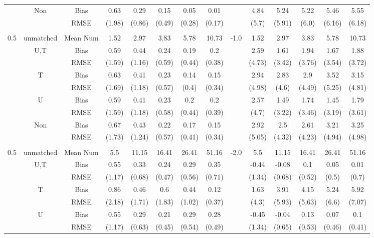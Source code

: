 \begin{tabular}{@{\extracolsep{5pt}}lc|cccccc|lccccc}
 & Non & Bias & 0.63 & 0.29 & 0.15 & 0.05 & 0.01 &  & 4.84 & 5.24 & 5.22 & 5.46 & 5.55 \\
 &  & RMSE & (1.98) & (0.86) & (0.49) & (0.28) & (0.17) &  & (5.7) & (5.91) & (6.0) & (6.16) & (6.18) \\
 &  &  &  &  &  &  &  &  &  &  &  &  &  \\
0.5 & unmatched & Mean Num & 1.52 & 2.97 & 3.83 & 5.78 & 10.73 & -1.0 & 1.52 & 2.97 & 3.83 & 5.78 & 10.73 \\
 & U,T & Bias & 0.59 & 0.44 & 0.24 & 0.19 & 0.2 &  & 2.59 & 1.61 & 1.94 & 1.67 & 1.88 \\
 &  & RMSE & (1.59) & (1.16) & (0.59) & (0.44) & (0.38) &  & (4.73) & (3.42) & (3.76) & (3.54) & (3.72) \\
 & T & Bias & 0.63 & 0.41 & 0.23 & 0.14 & 0.15 &  & 2.94 & 2.83 & 2.9 & 3.52 & 3.15 \\
 &  & RMSE & (1.69) & (1.18) & (0.57) & (0.4) & (0.34) &  & (4.98) & (4.6) & (4.49) & (5.25) & (4.81) \\
 & U & Bias & 0.59 & 0.41 & 0.23 & 0.2 & 0.2 &  & 2.57 & 1.49 & 1.74 & 1.45 & 1.79 \\
 &  & RMSE & (1.59) & (1.18) & (0.58) & (0.44) & (0.39) &  & (4.7) & (3.22) & (3.46) & (3.19) & (3.61) \\
 & Non & Bias & 0.67 & 0.43 & 0.22 & 0.17 & 0.15 &  & 2.92 & 2.5 & 2.61 & 3.21 & 3.25 \\
 &  & RMSE & (1.73) & (1.24) & (0.57) & (0.41) & (0.34) &  & (5.05) & (4.32) & (4.23) & (4.94) & (4.98) \\
 &  &  &  &  &  &  &  &  &  &  &  &  &  \\
0.5 & unmatched & Mean Num & 5.5 & 11.15 & 16.41 & 26.41 & 51.16 & -2.0 & 5.5 & 11.15 & 16.41 & 26.41 & 51.16 \\
 & U,T & Bias & 0.55 & 0.33 & 0.24 & 0.29 & 0.35 &  & -0.44 & -0.08 & 0.1 & 0.05 & 0.01 \\
 &  & RMSE & (1.17) & (0.68) & (0.47) & (0.56) & (0.71) &  & (1.34) & (0.68) & (0.52) & (0.5) & (0.7) \\
 & T & Bias & 0.86 & 0.46 & 0.6 & 0.44 & 0.12 &  & 1.63 & 3.91 & 4.15 & 5.24 & 5.92 \\
 &  & RMSE & (2.18) & (1.71) & (1.83) & (1.02) & (0.37) &  & (4.3) & (5.93) & (5.63) & (6.6) & (7.07) \\
 & U & Bias & 0.55 & 0.29 & 0.21 & 0.29 & 0.28 &  & -0.45 & -0.04 & 0.13 & 0.07 & 0.1 \\
 &  & RMSE & (1.17) & (0.63) & (0.45) & (0.54) & (0.49) &  & (1.34) & (0.65) & (0.53) & (0.46) & (0.41) \\

\end{tabular}

